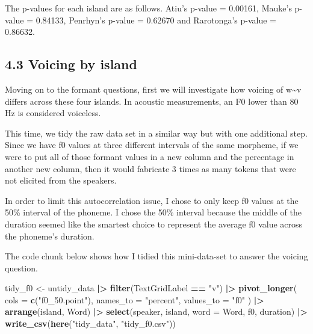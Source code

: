 \documentclass[
  ,man,floatsintext]{apa6}
\newenvironment{Shaded}{\begin{snugshade}}{\end{snugshade}}
\newcommand{\AttributeTok}[1]{\textcolor[rgb]{0.13,0.29,0.53}{#1}}
\newcommand{\FunctionTok}[1]{\textcolor[rgb]{0.13,0.29,0.53}{\textbf{#1}}}
\newcommand{\NormalTok}[1]{#1}
\newcommand{\OtherTok}[1]{\textcolor[rgb]{0.56,0.35,0.01}{#1}}
\newcommand{\SpecialCharTok}[1]{\textcolor[rgb]{0.81,0.36,0.00}{\textbf{#1}}}
\newcommand{\StringTok}[1]{\textcolor[rgb]{0.31,0.60,0.02}{#1}}
\begin{document}
The p-values for each island are as follows. Atiu's p-value = 0.00161, Mauke's p-value = 0.84133, Penrhyn's p-value = 0.62670 and Rarotonga's p-value = 0.86632.

\subsection{4.3 Voicing by island}\label{voicing-by-island}

Moving on to the formant questions, first we will investigate how voicing of w\textasciitilde v differs across these four islands. In acoustic measurements, an F0 lower than 80 Hz is considered voiceless.

This time, we tidy the raw data set in a similar way but with one additional step. Since we have f0 values at three different intervals of the same morpheme, if we were to put all of those formant values in a new column and the percentage in another new column, then it would fabricate 3 times as many tokens that were not elicited from the speakers.

In order to limit this autocorrelation issue, I chose to only keep f0 values at the 50\% interval of the phoneme. I chose the 50\% interval because the middle of the duration seemed like the smartest choice to represent the average f0 value across the phoneme's duration.

The code chunk below shows how I tidied this mini-data-set to answer the voicing question.

\begin{Shaded}
\begin{Highlighting}[]
\NormalTok{tidy\_f0 }\OtherTok{\textless{}{-}}\NormalTok{ untidy\_data }\SpecialCharTok{|\textgreater{}}
  \FunctionTok{filter}\NormalTok{(TextGridLabel }\SpecialCharTok{==} \StringTok{"v"}\NormalTok{) }\SpecialCharTok{|\textgreater{}}
  \FunctionTok{pivot\_longer}\NormalTok{(}
    \AttributeTok{cols =} \FunctionTok{c}\NormalTok{(}\StringTok{"f0\_50.point"}\NormalTok{), }
    \AttributeTok{names\_to =} \StringTok{"percent"}\NormalTok{,}
    \AttributeTok{values\_to =} \StringTok{"f0"}
\NormalTok{  ) }\SpecialCharTok{|\textgreater{}}
  \FunctionTok{arrange}\NormalTok{(island, Word) }\SpecialCharTok{|\textgreater{}}  
  \FunctionTok{select}\NormalTok{(speaker, island, }\AttributeTok{word =}\NormalTok{ Word, f0, duration) }\SpecialCharTok{|\textgreater{}}
  \FunctionTok{write\_csv}\NormalTok{(}\FunctionTok{here}\NormalTok{(}\StringTok{"tidy\_data"}\NormalTok{, }\StringTok{"tidy\_f0.csv"}\NormalTok{))}
\end{Highlighting}
\end{Shaded}
\end{document}
